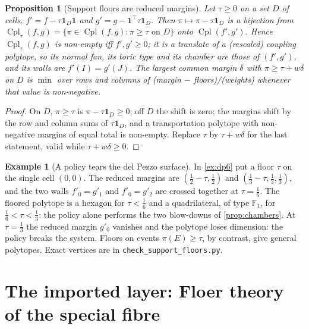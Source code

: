 \documentclass[11pt]{article}
\newtheorem{proposition}[theorem]{Proposition}
\theoremstyle{definition}
\newtheorem{example}[theorem]{Example}
\theoremstyle{remark}
\newcommand{\Cpl}{\operatorname{Cpl}}
\begin{document}
\begin{proposition}[Support floors are reduced margins]\label{prop:reducedmargins}
Let $\tau\ge0$ on a set $D$ of cells, $f'=f-\tau\mathbf 1_D\mathbf 1$ and $g'=g-\mathbf 1^\top\tau\mathbf 1_D$. Then
$\pi\mapsto\pi-\tau\mathbf 1_D$ is a bijection from $\Cpl_\tau(f,g)=\{\pi\in\Cpl(f,g):\pi\ge\tau\text{ on }D\}$ onto $\Cpl(f',g')$.
Hence $\Cpl_\tau(f,g)$ is non-empty iff $f',g'\ge0$; it is a translate of a (rescaled) coupling polytope, so its normal fan, its
toric type and its chamber are those of $(f',g')$, and its walls are $f'(I)=g'(J)$. The largest common margin $\delta$ with
$\pi\ge\tau+w\delta$ on $D$ is $\min$ over rows and columns of (margin $-$ floors)/(weights) whenever that value is
non-negative.
\end{proposition}
\begin{proof}
On $D$, $\pi\ge\tau$ is $\pi-\tau\mathbf 1_D\ge0$; off $D$ the shift is zero; the margins shift by the row and column sums of
$\tau\mathbf 1_D$, and a transportation polytope with non-negative margins of equal total is non-empty. Replace $\tau$ by
$\tau+w\delta$ for the last statement, valid while $\tau+w\delta\ge0$.
\end{proof}

\begin{example}[A policy tears the del Pezzo surface]\label{ex:policytear}
In \cref{ex:dp6} put a floor $\tau$ on the single cell $(0,0)$. The reduced margins are $(\tfrac12-\tau,\tfrac12)$ and
$(\tfrac13-\tau,\tfrac13,\tfrac13)$, and the two walls $f'_0=g'_1$ and $f'_0=g'_2$ are crossed together at $\tau=\tfrac16$. The
floored polytope is a hexagon for $\tau<\tfrac16$ and a quadrilateral, of type $\mathbb F_1$, for $\tfrac16<\tau<\tfrac13$: the policy
alone performs the two blow-downs of \cref{prop:chambers}. At $\tau=\tfrac13$ the reduced margin $g'_0$ vanishes and the polytope
loses dimension: the policy breaks the system. Floors on events $\pi(E)\ge\tau$, by contrast, give general polytopes. Exact vertices are in
\texttt{check\_support\_floors.py}.
\end{example}

\section{The imported layer: Floer theory of the special fibre}\label{sec:imported}
\end{document}
